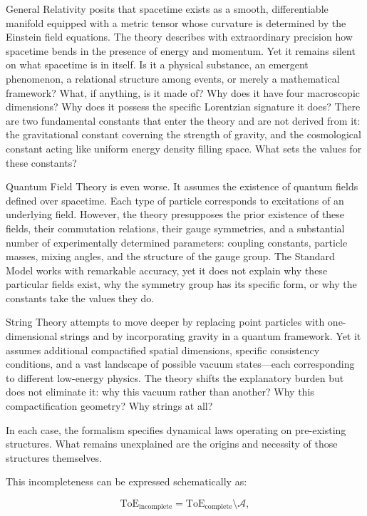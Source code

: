 General Relativity posits that spacetime exists as a smooth, differentiable manifold equipped with a metric tensor whose curvature is determined by the Einstein field equations. The theory describes with extraordinary precision how spacetime bends in the presence of energy and momentum. Yet it remains silent on what spacetime is in itself. Is it a physical substance, an emergent phenomenon, a relational structure among events, or merely a mathematical framework? What, if anything, is it made of? Why does it have four macroscopic dimensions? Why does it possess the specific Lorentzian signature it does? There are two fundamental constants that enter the theory and are not derived from it: the gravitational constant coverning the strength of gravity, and the cosmological constant acting like uniform energy density filling space. What sets the values for these constants?

Quantum Field Theory is even worse. It assumes the existence of quantum fields defined over spacetime. Each type of particle corresponds to excitations of an underlying field. However, the theory presupposes the prior existence of these fields, their commutation relations, their gauge symmetries, and a substantial number of experimentally determined parameters: coupling constants, particle masses, mixing angles, and the structure of the gauge group. The Standard Model works with remarkable accuracy, yet it does not explain why these particular fields exist, why the symmetry group has its specific form, or why the constants take the values they do.

String Theory attempts to move deeper by replacing point particles with one-dimensional strings and by incorporating gravity in a quantum framework. Yet it assumes additional compactified spatial dimensions, specific consistency conditions, and a vast landscape of possible vacuum states—each corresponding to different low-energy physics. The theory shifts the explanatory burden but does not eliminate it: why this vacuum rather than another? Why this compactification geometry? Why strings at all?

In each case, the formalism specifies dynamical laws operating on pre-existing structures. What remains unexplained are the origins and necessity of those structures themselves.

This incompleteness can be expressed schematically as:

\[
\text{ToE}_{\text{incomplete}} = \text{ToE}_{\text{complete}} \setminus \mathcal{A},
\]

